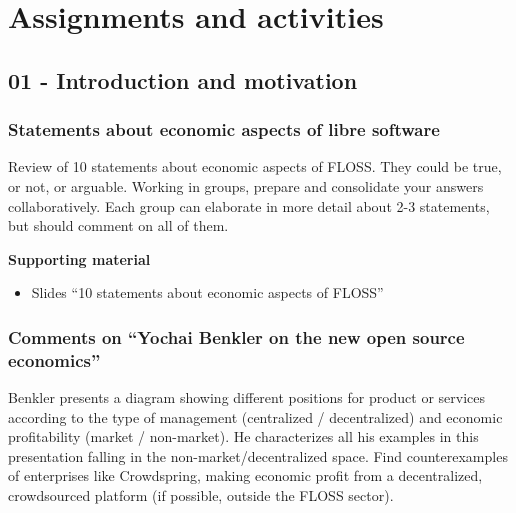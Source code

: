 \documentclass[a4paper]{article}
\begin{document}
\section{Assignments and activities}

\subsection{01 - Introduction and motivation}


\subsubsection{Statements about economic aspects of libre software}
\label{sub:statements-eco}

Review of 10 statements about economic aspects of FLOSS. They could be true, or not, or arguable. Working in groups, prepare and consolidate your answers collaboratively. Each group can elaborate in more detail about 2-3 statements, but should comment on all of them.

\textbf{Supporting material}

\begin{itemize}
\item Slides ``10 statements about economic aspects of FLOSS''
\end{itemize}

\subsubsection{Comments on ``Yochai Benkler on the new open source economics''}
\label{sub:comments-benkler}

Benkler presents a diagram showing different positions for product or services according to the type of management (centralized / decentralized) and economic profitability (market / non-market). He characterizes all his examples in this presentation falling in the non-market/decentralized space. Find counterexamples of enterprises like Crowdspring, making economic profit from a decentralized, crowdsourced platform (if possible, outside the FLOSS sector).
\end{document}

